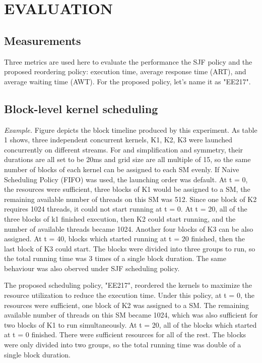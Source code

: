 \documentclass[12pt,journal,compsoc]{IEEEtran}
\begin{document}
\section{EVALUATION}
\subsection{Measurements}
Three metrics are used here to evaluate the performance the SJF policy and the proposed reordering policy: execution time, average response time (ART), and average waiting time (AWT). For the proposed policy, let's name it as "EE217".

\subsection{Block-level kernel scheduling}
\textit{Example.}
Figure depicts the block timeline produced by this experiment. As table 1 shows, three independent concurrent kernels, K1, K2, K3 were launched concurrently on different streams. For and simplification and symmetry, their durations are all set to be 20ms and grid size are all multiple of 15, so the same number of blocks of each kernel can be assigned to each SM evenly. If Naive Scheduling Policy (FIFO) was used, the launching order was default. At t = 0, the resources were sufficient, three blocks of K1 would be assigned to a SM, the remaining available number of threads on this SM was 512. Since one block of K2 requires 1024 threads, it could not start running at t = 0. At t = 20, all of the three blocks of k1 finished execution, then K2 could start running, and the number of available threads became 1024. Another four blocks of K3 can be also assigned. At t = 40, blocks which started running at t = 20 finished, then the last block of K3 could start. The blocks were divided into three groups to run, so the total running time was 3 times of a single block duration. The same behaviour was also oberved under SJF scheduling policy.

The proposed scheduling policy, "EE217", reordered the kernels to maximize the resource utilization to reduce the execution time. Under this policy, at t = 0, the resources were sufficient, one block of K2 was assigned to a SM. The remaining available number of threads on this SM became 1024, which was also sufficient for two blocks of K1 to run simultaneously. At t = 20, all of the blocks which started at t = 0 finished. There were sufficient resources for all of the rest. The blocks were only divided into two groups, so the total running time was double of a single block duration.
\end{document}
